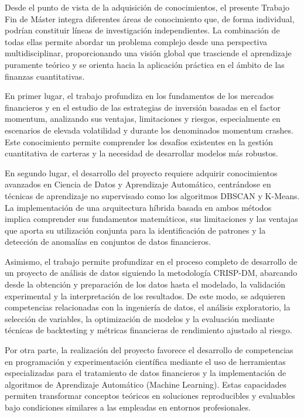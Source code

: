 \documentclass[
]{article}
\begin{document}
Desde el punto de vista de la adquisición de conocimientos, el presente Trabajo Fin de Máster integra diferentes áreas de conocimiento que, de forma individual, podrían constituir líneas de investigación independientes. La combinación de todas ellas permite abordar un problema complejo desde una perspectiva multidisciplinar, proporcionando una visión global que trasciende el aprendizaje puramente teórico y se orienta hacia la aplicación práctica en el ámbito de las finanzas cuantitativas.

En primer lugar, el trabajo profundiza en los fundamentos de los mercados financieros y en el estudio de las estrategias de inversión basadas en el factor \gls{momentum}, analizando sus ventajas, limitaciones y riesgos, especialmente en escenarios de elevada volatilidad y durante los denominados momentum crashes. Este conocimiento permite comprender los desafíos existentes en la gestión cuantitativa de carteras y la necesidad de desarrollar modelos más robustos.

En segundo lugar, el desarrollo del proyecto requiere adquirir conocimientos avanzados en Ciencia de Datos y Aprendizaje Automático, centrándose en técnicas de aprendizaje no supervisado como los algoritmos DBSCAN y K-Means. La implementación de una arquitectura híbrida basada en ambos métodos implica comprender sus fundamentos matemáticos, sus limitaciones y las ventajas que aporta su utilización conjunta para la identificación de patrones y la detección de anomalías en conjuntos de datos financieros.

Asimismo, el trabajo permite profundizar en el proceso completo de desarrollo de un proyecto de análisis de datos siguiendo la metodología CRISP-DM, abarcando desde la obtención y preparación de los datos hasta el modelado, la validación experimental y la interpretación de los resultados. De este modo, se adquieren competencias relacionadas con la ingeniería de datos, el análisis exploratorio, la selección de variables, la optimización de modelos y la evaluación mediante técnicas de backtesting y métricas financieras de rendimiento ajustado al riesgo.

Por otra parte, la realización del proyecto favorece el desarrollo de competencias en programación y experimentación científica mediante el uso de herramientas especializadas para el tratamiento de datos financieros y la implementación de algoritmos de Aprendizaje Automático (Machine Learning). Estas capacidades permiten transformar conceptos teóricos en soluciones reproducibles y evaluables bajo condiciones similares a las empleadas en entornos profesionales.
\end{document}
